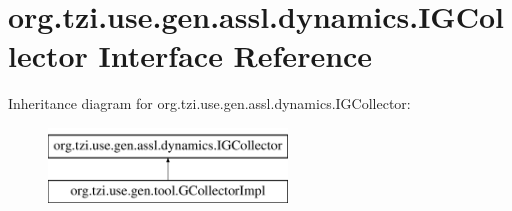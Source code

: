 \hypertarget{interfaceorg_1_1tzi_1_1use_1_1gen_1_1assl_1_1dynamics_1_1_i_g_collector}{\section{org.\-tzi.\-use.\-gen.\-assl.\-dynamics.\-I\-G\-Collector Interface Reference}
\label{interfaceorg_1_1tzi_1_1use_1_1gen_1_1assl_1_1dynamics_1_1_i_g_collector}
}
Inheritance diagram for org.\-tzi.\-use.\-gen.\-assl.\-dynamics.\-I\-G\-Collector\-:\begin{figure}[H]
\begin{center}
\leavevmode
\includegraphics[height=2.000000cm]{interfaceorg_1_1tzi_1_1use_1_1gen_1_1assl_1_1dynamics_1_1_i_g_collector}
\end{center}
\end{figure}
